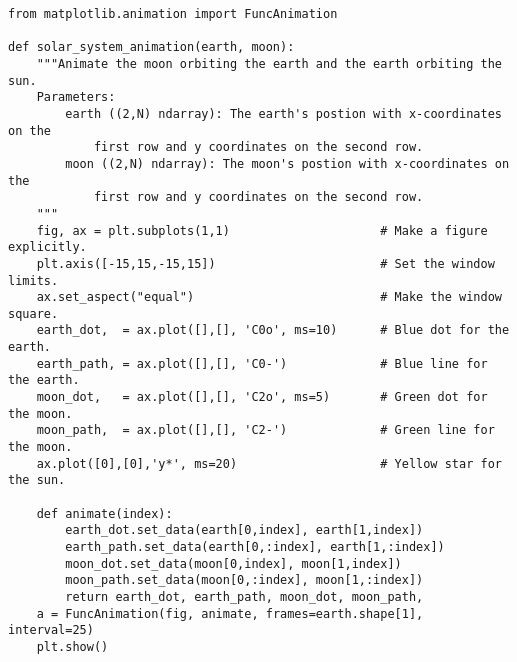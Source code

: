 \begin{lstlisting}
from matplotlib.animation import FuncAnimation

def solar_system_animation(earth, moon):
    """Animate the moon orbiting the earth and the earth orbiting the sun.
    Parameters:
        earth ((2,N) ndarray): The earth's postion with x-coordinates on the
            first row and y coordinates on the second row.
        moon ((2,N) ndarray): The moon's postion with x-coordinates on the
            first row and y coordinates on the second row.
    """
    fig, ax = plt.subplots(1,1)                     # Make a figure explicitly.
    plt.axis([-15,15,-15,15])                       # Set the window limits.
    ax.set_aspect("equal")                          # Make the window square.
    earth_dot,  = ax.plot([],[], 'C0o', ms=10)      # Blue dot for the earth.
    earth_path, = ax.plot([],[], 'C0-')             # Blue line for the earth.
    moon_dot,   = ax.plot([],[], 'C2o', ms=5)       # Green dot for the moon.
    moon_path,  = ax.plot([],[], 'C2-')             # Green line for the moon.
    ax.plot([0],[0],'y*', ms=20)                    # Yellow star for the sun.

    def animate(index):
        earth_dot.set_data(earth[0,index], earth[1,index])
        earth_path.set_data(earth[0,:index], earth[1,:index])
        moon_dot.set_data(moon[0,index], moon[1,index])
        moon_path.set_data(moon[0,:index], moon[1,:index])
        return earth_dot, earth_path, moon_dot, moon_path,
    a = FuncAnimation(fig, animate, frames=earth.shape[1], interval=25)
    plt.show()
\end{lstlisting}


\begin{comment} %
\subsection*{Celestial Mechanics} %

The solar system simulation using only linear transformations is not really a physical model.
A more accurate representation of celestial orbits would use differential equations involving gravitational force to describe the motion.

In the early 1600s Johannes Kepler discovered that planets travel around the sun in elliptical orbits.
Simulating an elliptical orbit requires a more complicated physical model because the speed and angular momentum of the celestial body are not constant in time.
However, with only 2 bodies (the earth and the sun), it is still fairly simple to completely describe the system for all time using dynamical systems.
Once a third body (the moon) is introduced into the system, however, it becomes incredibly difficult to accurately describe the system.
This phenomenon is referred to as the 3-body problem.
\end{comment}
